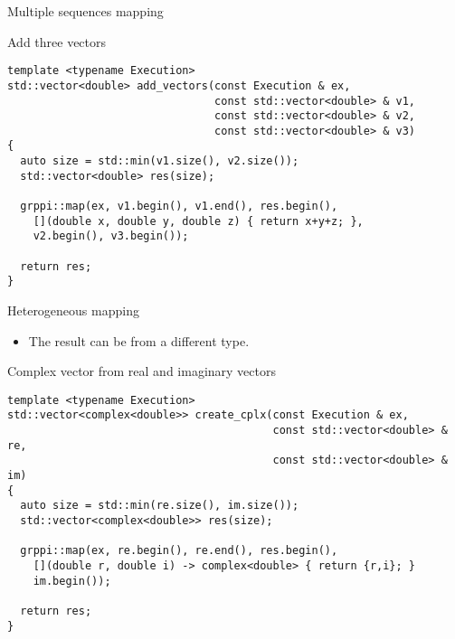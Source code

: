 \begin{frame}[t,fragile]{Multiple sequences mapping}
\begin{block}{Add three vectors}
\begin{lstlisting}
template <typename Execution>
std::vector<double> add_vectors(const Execution & ex, 
                                const std::vector<double> & v1,
                                const std::vector<double> & v2,
                                const std::vector<double> & v3) 
{
  auto size = std::min(v1.size(), v2.size());
  std::vector<double> res(size);

  grppi::map(ex, v1.begin(), v1.end(), res.begin(),
    [](double x, double y, double z) { return x+y+z; },
    v2.begin(), v3.begin());

  return res;
}
\end{lstlisting}
\end{block}
\end{frame}

\begin{frame}[t,fragile]{Heterogeneous mapping}
\begin{itemize}
  \item The result can be from a different type.
\end{itemize}
\begin{block}{Complex vector from real and imaginary vectors}
\begin{lstlisting}
template <typename Execution>
std::vector<complex<double>> create_cplx(const Execution & ex,
                                         const std::vector<double> & re,
                                         const std::vector<double> & im)
{
  auto size = std::min(re.size(), im.size());
  std::vector<complex<double>> res(size);

  grppi::map(ex, re.begin(), re.end(), res.begin(),
    [](double r, double i) -> complex<double> { return {r,i}; }
    im.begin());

  return res;
}
\end{lstlisting}
\end{block}
\end{frame}
